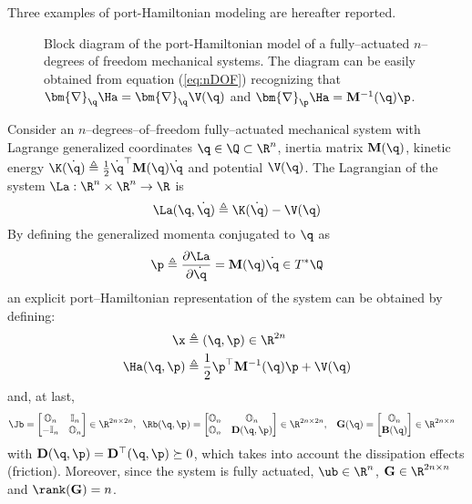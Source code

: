 %
Three examples of port-Hamiltonian modeling are hereafter reported.  
%
\begin{exmp}\label{ex:ndof}
	\begin{figure}[!b]
	    \centering
	    
	    \caption[Block diagram of the port-Hamiltonian model of a fully--actuated $n$--degrees of freedom mechanical systems.]{Block diagram of the port-Hamiltonian model of a fully--actuated $n$--degrees of freedom mechanical systems. The diagram can be easily obtained from equation (\ref{eq:nDOF}) recognizing that $\bm{\nabla}_\q\Ha = \bm{\nabla}_\q\V(\q)$ and $\bm{\nabla}_\p\Ha = \mathbf{M}^{-1}(\q)\p$.}
	    \label{fig:MECHscheme}
	\end{figure}
    Consider an $n$--degrees--of--freedom fully--actuated mechanical system with Lagrange generalized coordinates $\q\in\Q\subset\R^n$, inertia matrix $\mathbf{M}(\q)$, kinetic energy $\K(\dot{\q})\triangleq\frac{1}{2}\dot{\q}^\top \mathbf{M}(\q)\dot{\q}$ and potential $\V(\q)$. The Lagrangian of the system $\La:\R^n\times\R^n\rightarrow\R$ is
    \begin{equation}
        \La(\q,\dot{\q}) \triangleq  \K(\dot{\q}) - \V(\q)
    \end{equation}
    By defining the generalized momenta conjugated to $\q$ as
    \begin{equation}
        \p \triangleq \frac{\partial \La}{\partial \dot{\q}} = \mathbf{M}(\q)\dot{\q}\in T^*\Q    
    \end{equation}
    an explicit port--Hamiltonian representation of the system can be obtained by defining:
	\begin{align}
	    \x &\triangleq (\q,\p)\in\R^{2n}\\
	    \Ha(\q,\p) &\triangleq\frac{1}{2}\p^\top\mathbf{M}^{-1}(\q)\p + \V(\q)
	\end{align}
	and, at last,
	\begin{align*}
	    \Jb = \begin{bmatrix}
	        \mathbb{O}_n&\mathbb{I}_n\\
	        -\mathbb{I}_n&\mathbb{O}_n
	    \end{bmatrix}\in\R^{2n\times 2n},~~ &
	    \Rb(\q,\p) = \begin{bmatrix}
	        \mathbb{O}_n&\mathbb{O}_n\\\mathbb{O}_n&\mathbf{D}(\q,\p)
	    \end{bmatrix}\in\R^{2n\times 2n}, &
	    \mathbf{G}(\q)=\begin{bmatrix}
	        \mathbb{O}_{n}\\\mathbf{B}(\q)
	    \end{bmatrix}\in\R^{2n\times n} &
	\end{align*}
	with $\mathbf{D}(\q,\p) = \mathbf{D}^\top(\q,\p)\succeq 0$, which takes into account the dissipation effects (friction). Moreover, since the system is fully actuated, $\ub\in\R^n$, $\mathbf{G}\in\R^{2n\times n}$ and $\rank(\mathbf{G}) = n$.
	

\end{exmp}
